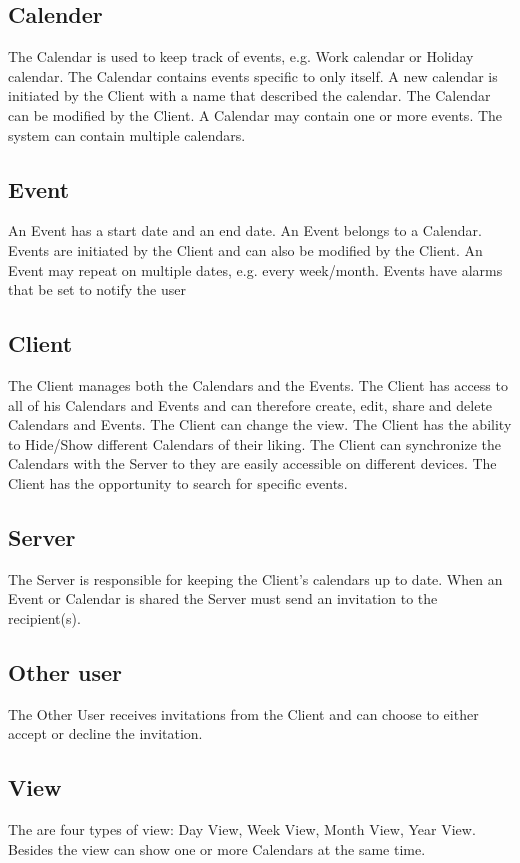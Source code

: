 \subsection*{Calender}
The Calendar is used to keep track of events, e.g. Work calendar or Holiday calendar. The Calendar contains events specific to only itself.
A new calendar is initiated by the Client with a name that described the calendar. The Calendar can be modified by the Client.
 A Calendar may contain one or more events. The system can contain multiple calendars.

\subsection*{Event}
An Event has a start date and an end date.
An Event belongs to a Calendar. Events are initiated by the Client and can also be modified by the Client.
An Event may repeat on multiple dates, e.g. every week/month.
Events have alarms that be set to notify the user

\subsection*{Client}
The Client manages both the Calendars and the Events.
The Client has access to all of his Calendars and Events and can therefore create, edit, share and delete Calendars and Events.
The Client can change the view.
The Client has the ability to Hide/Show different Calendars of their liking.
The Client can synchronize the Calendars with the Server to they are easily accessible on different devices.
The Client has the opportunity to search for specific events.

\subsection*{Server}
The Server is responsible for keeping the Client’s calendars up to date.
When an Event or Calendar is shared the Server must send an invitation to the recipient(s).

\subsection*{Other user}
The Other User receives invitations from the Client and can choose to either accept or decline the invitation.

\subsection*{View}
The are four types of view: Day View, Week View, Month View, Year View.
Besides the view can show one or more Calendars at the same time.

